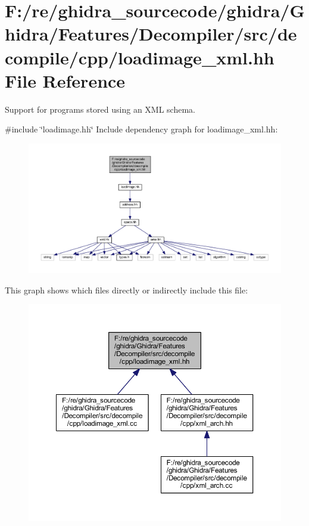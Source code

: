 \hypertarget{loadimage__xml_8hh}{}\section{F\+:/re/ghidra\+\_\+sourcecode/ghidra/\+Ghidra/\+Features/\+Decompiler/src/decompile/cpp/loadimage\+\_\+xml.hh File Reference}
\label{loadimage__xml_8hh}


Support for programs stored using an X\+ML schema.  


{\ttfamily \#include \char`\"{}loadimage.\+hh\char`\"{}}\newline
Include dependency graph for loadimage\+\_\+xml.\+hh\+:
\nopagebreak
\begin{figure}[H]
\begin{center}
\leavevmode
\includegraphics[width=350pt]{loadimage__xml_8hh__incl}
\end{center}
\end{figure}
This graph shows which files directly or indirectly include this file\+:
\nopagebreak
\begin{figure}[H]
\begin{center}
\leavevmode
\includegraphics[width=350pt]{loadimage__xml_8hh__dep__incl}
\end{center}
\end{figure}
